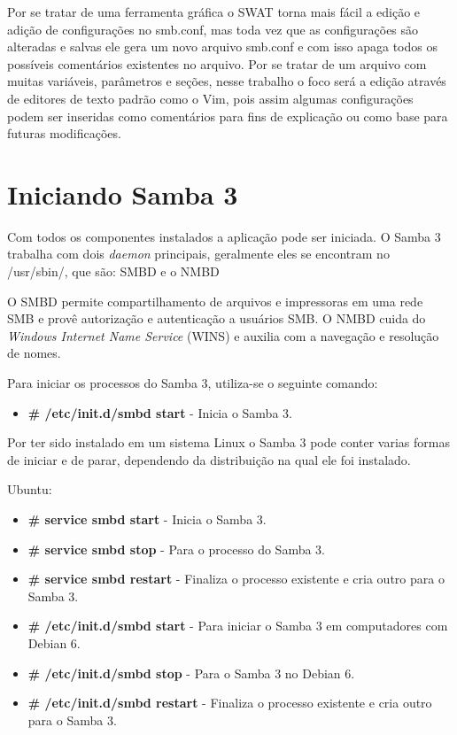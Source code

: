 Por se tratar de uma ferramenta gráfica o SWAT torna mais fácil a edição e adição de configurações no smb.conf, mas toda vez que as configurações são alteradas e salvas ele gera um novo arquivo smb.conf e com isso apaga todos os possíveis comentários existentes no arquivo. Por se tratar de um arquivo com muitas variáveis, parâmetros e seções, nesse trabalho o foco será a edição através de editores de texto padrão como o Vim, pois assim algumas configurações podem ser inseridas como comentários para fins de explicação ou como base para futuras modificações.

\section{Iniciando Samba 3}

Com todos os componentes instalados a aplicação pode ser iniciada. O Samba 3 trabalha com dois \textit{daemon} principais, geralmente eles se encontram no /usr/sbin/,  que são: SMBD e o NMBD

O SMBD permite compartilhamento de arquivos e impressoras em uma rede SMB e provê autorização e autenticação a usuários SMB. O NMBD cuida do \textit{Windows Internet Name Service} (WINS) e auxilia com a navegação e resolução de nomes.\cite{SAMBA}

Para iniciar os processos do Samba 3, utiliza-se o seguinte comando:
\begin{itemize}
	\item \textbf{\# /etc/init.d/smbd start} - Inicia o Samba 3.	
\end{itemize}

Por ter sido instalado em um sistema Linux o Samba 3 pode conter varias formas de iniciar e de parar, dependendo da distribuição na qual ele foi instalado.

Ubuntu:
\begin{itemize}
	\item \textbf{\# service smbd start} - Inicia o Samba 3.
	\item \textbf{\# service smbd stop} - Para o processo do Samba 3.
	\item \textbf{\# service smbd restart} - Finaliza o processo existente e cria outro para o Samba 3.
	\item \textbf{\# /etc/init.d/smbd start} - Para iniciar o Samba 3 em computadores com Debian 6.
	\item \textbf{\# /etc/init.d/smbd stop} - Para o Samba 3 no Debian 6.
	\item \textbf{\# /etc/init.d/smbd restart} - Finaliza o processo existente e cria outro para o Samba 3.
\end{itemize}

